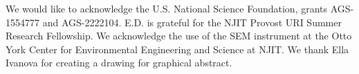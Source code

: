 We would like to acknowledge the U.S. National Science Foundation, grants AGS-1554777 and AGS-2222104. E.D. is grateful for the NJIT Provost
URI Summer Research Fellowship. We acknowledge the use of the SEM instrument at the Otto York Center for Environmental Engineering and Science at NJIT. We thank Ella Ivanova for creating a drawing for graphical abstract.
